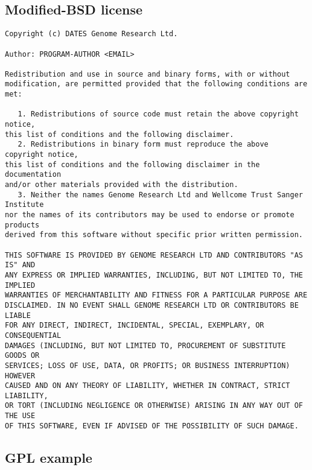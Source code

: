 \documentclass[10pt,a4paper]{article}
\begin{document}
\subsection{Modified-BSD license}
\begin{boilerplate}
\begin{verbatim}
Copyright (c) DATES Genome Research Ltd. 

Author: PROGRAM-AUTHOR <EMAIL> 

Redistribution and use in source and binary forms, with or without 
modification, are permitted provided that the following conditions are met: 

   1. Redistributions of source code must retain the above copyright notice,
this list of conditions and the following disclaimer.
   2. Redistributions in binary form must reproduce the above copyright notice,
this list of conditions and the following disclaimer in the documentation
and/or other materials provided with the distribution.
   3. Neither the names Genome Research Ltd and Wellcome Trust Sanger Institute
nor the names of its contributors may be used to endorse or promote products
derived from this software without specific prior written permission.

THIS SOFTWARE IS PROVIDED BY GENOME RESEARCH LTD AND CONTRIBUTORS "AS IS" AND 
ANY EXPRESS OR IMPLIED WARRANTIES, INCLUDING, BUT NOT LIMITED TO, THE IMPLIED 
WARRANTIES OF MERCHANTABILITY AND FITNESS FOR A PARTICULAR PURPOSE ARE 
DISCLAIMED. IN NO EVENT SHALL GENOME RESEARCH LTD OR CONTRIBUTORS BE LIABLE 
FOR ANY DIRECT, INDIRECT, INCIDENTAL, SPECIAL, EXEMPLARY, OR CONSEQUENTIAL 
DAMAGES (INCLUDING, BUT NOT LIMITED TO, PROCUREMENT OF SUBSTITUTE GOODS OR 
SERVICES; LOSS OF USE, DATA, OR PROFITS; OR BUSINESS INTERRUPTION) HOWEVER 
CAUSED AND ON ANY THEORY OF LIABILITY, WHETHER IN CONTRACT, STRICT LIABILITY, 
OR TORT (INCLUDING NEGLIGENCE OR OTHERWISE) ARISING IN ANY WAY OUT OF THE USE 
OF THIS SOFTWARE, EVEN IF ADVISED OF THE POSSIBILITY OF SUCH DAMAGE.
\end{verbatim}
\end{boilerplate}

\subsection{GPL example}
\end{document}
